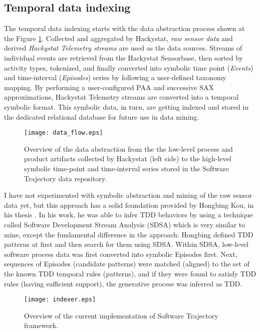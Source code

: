 \subsection{Temporal data indexing} \label{indexing}
The temporal data indexing starts with the data abstraction process shown at the Figure \ref{fig:data_flow}. Collected and aggregated by Hackystat, \textit{raw sensor data} and derived \textit{Hackystat Telemetry streams} are used as the data sources. Streams of individual events are retrieved from the Hackystat Sensorbase, then sorted by activity types, tokenized, and finally converted into symbolic time point (\textit{Events}) and time-interval (\textit{Episodes}) series by following a user-defined taxonomy mapping. By performing a user-configured PAA and successive SAX approximations, Hackystat Telemetry streams are converted into a temporal symbolic format. This symbolic data, in turn, are getting indexed and stored in the dedicated relational database for future use in data mining.

\begin{figure}[tbp]
   \centering
   \texttt{[image: data\_flow.eps]}
   \caption{Overview of the data abstraction from the the low-level process and product artifacts collected by Hackystat (left side) to the high-level symbolic time-point and time-interval series stored in the Software Trajectory data repository.}
   \label{fig:data_flow}
\end{figure}

I have not experimented with symbolic abstraction and mining of the raw sensor data yet, but this approach has a solid foundation provided by Hongbing Kou, in his thesis \cite{citeulike:2703162}. In his work, he was able to infer TDD behaviors by using a technique called Software Development Stream Analysis (SDSA) which is very similar to mine, except the fundamental difference in the approach: Hongbing defined TDD patterns at first and then search for them using SDSA. Within SDSA, low-level software process data was first converted into symbolic Episodes first. Next, sequences of Episodes (candidate patterns) were matched (aligned) to the set of the known TDD temporal rules (patterns), and if they were found to satisfy TDD rules (having sufficient support), the generative process was inferred as TDD.

\begin{figure}[tbp]
   \centering
   \texttt{[image: indexer.eps]}
   \caption{Overview of the current implementation of Software Trajectory framework.}
   \label{fig:indexer}
\end{figure}

